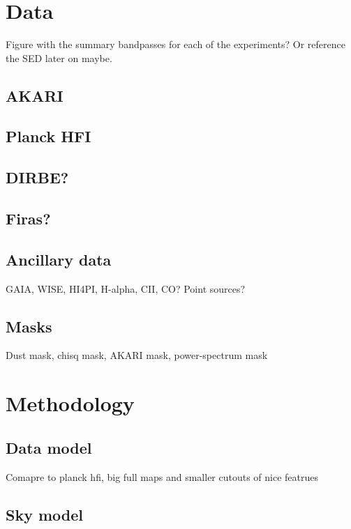 \documentclass{aa}
\begin{document}
\section{Data}
\label{sec:data}
Figure with the summary bandpasses for each of the experiments? Or reference the SED later on maybe. 
\subsection{AKARI}
\label{sec:dat_akari}


\subsection{Planck HFI}
\label{sec:dat_planck}

\subsection{DIRBE?}
\label{sec:dat_dir}

\subsection{Firas?}
\label{sec:dat_fir}


\subsection{Ancillary data}
\label{sec:dat_anc}
GAIA, WISE, HI4PI, H-alpha, CII, CO? 
Point sources? 

\subsection{Masks}
\label{sec:masks}
Dust mask, chisq mask, AKARI mask, power-spectrum mask


\section{Methodology}
\label{sec:method}

\subsection{Data model}
\label{sec:model}
Comapre to planck hfi, big full maps and smaller cutouts of nice featrues

\subsection{Sky model}
\label{sec:sky_model}
\end{document}
